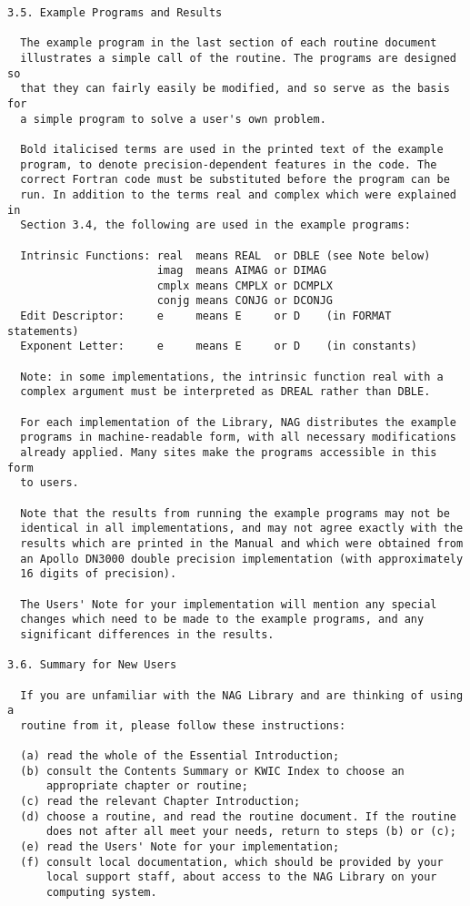 \begin{verbatim}
3.5. Example Programs and Results
 
  The example program in the last section of each routine document
  illustrates a simple call of the routine. The programs are designed so
  that they can fairly easily be modified, and so serve as the basis for
  a simple program to solve a user's own problem.
 
  Bold italicised terms are used in the printed text of the example
  program, to denote precision-dependent features in the code. The
  correct Fortran code must be substituted before the program can be
  run. In addition to the terms real and complex which were explained in
  Section 3.4, the following are used in the example programs:
 
  Intrinsic Functions: real  means REAL  or DBLE (see Note below)
                       imag  means AIMAG or DIMAG
                       cmplx means CMPLX or DCMPLX
                       conjg means CONJG or DCONJG
  Edit Descriptor:     e     means E     or D    (in FORMAT statements)
  Exponent Letter:     e     means E     or D    (in constants)
 
  Note: in some implementations, the intrinsic function real with a
  complex argument must be interpreted as DREAL rather than DBLE.
 
  For each implementation of the Library, NAG distributes the example
  programs in machine-readable form, with all necessary modifications
  already applied. Many sites make the programs accessible in this form
  to users.
 
  Note that the results from running the example programs may not be
  identical in all implementations, and may not agree exactly with the
  results which are printed in the Manual and which were obtained from
  an Apollo DN3000 double precision implementation (with approximately
  16 digits of precision).
 
  The Users' Note for your implementation will mention any special
  changes which need to be made to the example programs, and any
  significant differences in the results.
 
3.6. Summary for New Users
 
  If you are unfamiliar with the NAG Library and are thinking of using a
  routine from it, please follow these instructions:
 
  (a) read the whole of the Essential Introduction;
  (b) consult the Contents Summary or KWIC Index to choose an
      appropriate chapter or routine;
  (c) read the relevant Chapter Introduction;
  (d) choose a routine, and read the routine document. If the routine
      does not after all meet your needs, return to steps (b) or (c);
  (e) read the Users' Note for your implementation;
  (f) consult local documentation, which should be provided by your
      local support staff, about access to the NAG Library on your
      computing system.
 

\end{verbatim}
